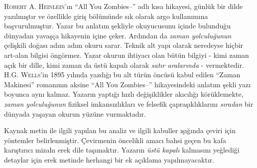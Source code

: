 \textsc{Robert A. Heinlein}'ın ``All You Zombies--'' adlı kısa hikayesi, günlük
bir dilde yazılmıştır ve özellikle giriş bölümünde sık olarak argo kullanımına
başvurulmuştur. Yazar bu anlatım şekliyle okuyucusunu içinde bulunduğu dünyadan
yavaşça hikayenin içine çeker. Ardından da \emph{zaman yolculuğunun} çelişkili
doğası adım adım okuru sarar. Teknik alt yapı olarak neredeyse hiçbir art-alan
bilgisi öngörmez. Yazar okurun ihtiyacı olan bütün bilgiyi - kimi zaman açık
bir dille, kimi zaman da üstü kapalı olarak \emph{satır aralarında} -
vermektedir. \textsc{H.G. Wells}'in 1895 yılında yazdığı bu alt türün öncüsü
kabul edilen ``Zaman Makinesi'' romanının aksine ``All You Zombies--''
hikayesindeki anlatım şekli yazı boyunca aynı kalmaz. Yazarın yaptığı hızlı
değişiklikler akıcılığı körüklemekte, \emph{zaman yolculuğunun} fiziksel
imkansızlıkları ve felsefik çapraşıklıklarını \emph{sıradan} bir dünyada yaşayan
okurun yüzüne vurmaktadır.

Kaynak metin ile ilgili yapılan bu analiz ve ilgili kabuller ışığında çeviri
için yöntemler belirlenmiştir. Çevirmenin öncelikli amacı bahsi geçen bu kafa
karıştırıcı mizahı erek dile taşımaktır. Yazarın \emph{üstü kapalı} kalmasını
yeğlediği detaylar için erek metinde herhangi bir ek açıklama yapılmayacaktır.

